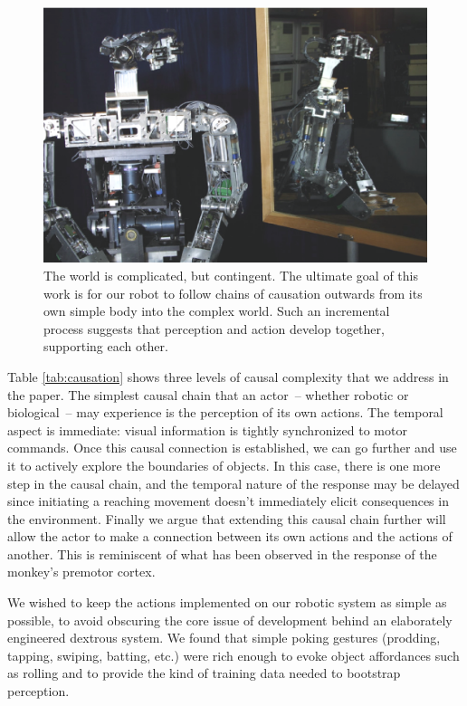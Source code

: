 \ifverbose
\begin{figure}[tbh]
\begin{center}
\includegraphics[width=12cm]{mirror-cog.eps}
\caption{ 
\label{fig:mirror-cog}
%
The world is complicated, but contingent.
The ultimate goal of this work is for our robot to follow chains of
causation outwards from its own simple body into the complex world.
Such an incremental process suggests that perception and action
develop together, supporting each other.
%
}
\end{center}
\end{figure}
\fi


Table \ref{tab:causation} shows three levels of causal complexity
that we address in the paper.
The simplest causal chain that an actor~-- whether robotic or biological~-- may experience is the
perception of its own actions.  The temporal aspect is immediate:
visual information is tightly synchronized to motor commands.
Once this causal connection is established, we can go further and use
it to actively explore the boundaries of objects.  In this case, there
is one more step in the causal chain, and the temporal nature of
the response may be delayed since initiating a reaching movement doesn't
immediately elicit consequences in the environment.  
Finally we argue that extending this causal chain further will allow
the actor to make a connection between its own actions and the actions 
of another. This is reminiscent of what has been observed in the response
of the monkey's premotor cortex. 

%
%
%
We wished to keep the actions implemented on our robotic system as
simple as possible, to avoid obscuring the core issue of development
behind an elaborately engineered dextrous system.
%
%
%
%
We found that simple poking gestures
(prodding, tapping, swiping, batting, etc.) were rich enough 
to evoke object affordances such as rolling and to provide
the kind of training data needed to bootstrap perception.


